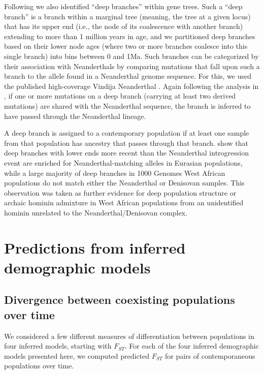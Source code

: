 \documentclass[]{article}
\begin{document}
Following \citet{Speidel2019-nj} we also identified “deep branches” within gene
trees. Such a “deep branch” is a branch within a marginal tree (meaning, the
tree at a given locus) that has its upper end (i.e., the node of its
coalescence with another branch) extending to more than 1 million years in age,
and we partitioned deep branches based on their lower node ages (where two or
more branches coalesce into this single branch) into bins between 0 and 1Ma.
Such branches can be categorized by their association with Neanderthals by
comparing mutations that fall upon such a branch to the allele found in a
Neanderthal genome sequence. For this, we used the published high-coverage
Vindija Neanderthal \citep{Prufer2017-kk}. Again following the analysis in
\citet{Speidel2019-nj}, if one or more mutations on a deep branch (carrying at
least two derived mutations) are shared with the Neanderthal sequence, the
branch is inferred to have passed through the Neanderthal lineage.

A deep branch is assigned to a contemporary population if at least one sample
from that population has ancestry that passes through that branch.
\citet{Speidel2019-nj} show that deep branches with lower ends more recent than
the Neanderthal introgression event are enriched for Neanderthal-matching
alleles in Eurasian populations, while a large majority of deep branches in
1000 Genomes West African populations do not match either the Neanderthal or
Denisovan samples. This observation was taken as further evidence for deep
population structure or archaic hominin admixture in West African populations from an
unidentified hominin unrelated to the Neanderthal/Denisovan complex.

\section{Predictions from inferred demographic models}

\subsection{Divergence between coexisting populations over time}

We considered a few different measures of differentiation between populations
in four inferred models, starting with $F_{ST}.$ For each of the four inferred
demographic models presented here, we computed predicted $F_{ST}$ for pairs of
contemporaneous populations over time. 
\end{document}
